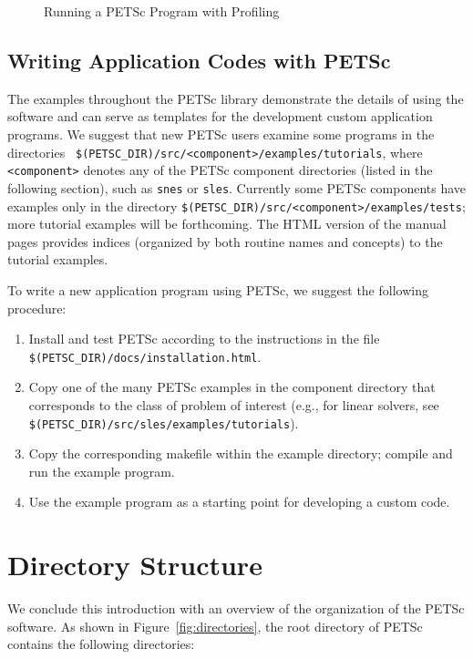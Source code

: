 {\begin{figure}[H]
{\begin{verbatim}
\end{verbatim}
}
\nobreak
\caption{Running a PETSc Program with Profiling}
\label{fig:exprof}
\end{figure}

\subsection*{Writing Application Codes with PETSc}

The examples throughout the PETSc library demonstrate the details of
using the software and can serve as templates for the development
custom application programs.  We suggest that new PETSc
users examine some programs in the directories {\tt
\$(PETSC\_DIR)/src/<component>/examples/tutorials}, where {\tt <component>}
denotes any of the PETSc component directories (listed in the following
section), such as {\tt snes} or {\tt sles}.  
Currently some PETSc components have examples only in the directory
{\tt \$(PETSC\_DIR)/src/<component>/examples/tests}; more tutorial examples
will be forthcoming.  The HTML version of the manual pages provides indices
(organized by both routine names and concepts) to the tutorial examples.

To write a new application program using PETSc, we suggest the
following procedure:
\begin{enumerate}
\item Install and test PETSc according to the instructions in the file
      {\tt \$(PETSC\_DIR)/docs/installation.html}.
\item Copy one of the many PETSc examples in the component directory
      that corresponds to the class of problem of interest (e.g.,
      for linear solvers, see {\tt \$(PETSC\_DIR)/src/sles/examples/tutorials}).
\item Copy the corresponding makefile within the example directory;
      compile and run the example program.
\item Use the example program as a starting point for developing a custom code.
\end{enumerate}


\section{Directory Structure}

We conclude this introduction with an overview of the
organization of the PETSc software.  As shown in Figure~\ref{fig:directories},
the root directory of PETSc contains the following directories:

}
